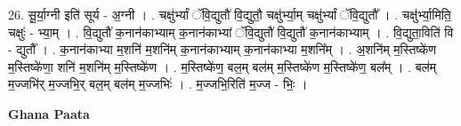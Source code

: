 \documentclass[17pt]{extarticle}
\begin{document}
26. सू॒र्या॒ग्नी इति॑ सूर्य - अ॒ग्नी । . चक्षु॑र्भ्यां ॅवि॒द्युतौ॑ वि॒द्युतौ॒ चक्षु॑र्भ्या॒म् चक्षु॑र्भ्यां ॅवि॒द्युतौ᳚ । . चक्षु॑र्भ्या॒मिति॒ चक्षुः॑ - भ्या॒म् । . वि॒द्युतौ॑ क॒नान॑काभ्याम् क॒नान॑काभ्यां ॅवि॒द्युतौ॑ वि॒द्युतौ॑ क॒नान॑काभ्याम् । . वि॒द्युता॒विति॑ वि - द्युतौ᳚ । . क॒नान॑काभ्या म॒शनि॑ म॒शनि॑म् क॒नान॑काभ्याम् क॒नान॑काभ्या म॒शनि᳚म् । . अ॒शनि॑म् म॒स्तिष्के॑ण म॒स्तिष्के॑णा॒ शनि॑ म॒शनि॑म् म॒स्तिष्के॑ण । . म॒स्तिष्के॑ण॒ बल॒म् बल॑म् म॒स्तिष्के॑ण म॒स्तिष्के॑ण॒ बल᳚म् । . बल॑म् म॒ज्जभि॑र् म॒ज्जभि॒र् बल॒म् बल॑म् म॒ज्जभिः॑ । . म॒ज्जभि॒रिति॑ म॒ज्ज - भिः॒ । \newline

\textbf{Ghana Paata } \newline
\end{document}
